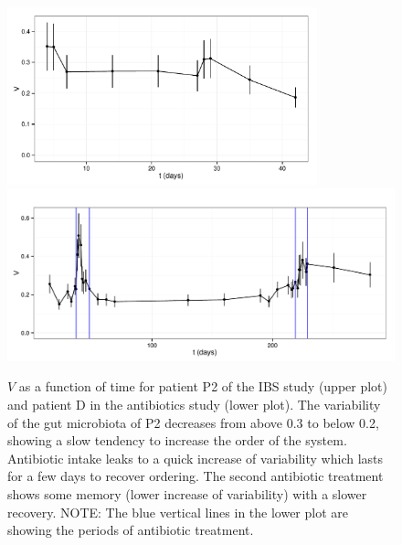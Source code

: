 \begin{figure}
	\centering 
 	\includegraphics[width=0.8\textwidth]{results/sliwin/patP2_IBS.pdf}
  	\includegraphics[width=1.0\textwidth]{results/sliwin/patD_antibio.pdf} 
\caption{$V$ as a function of time for patient P2 of the IBS study\cite{IBS} (upper plot) and patient D in the antibiotics study\cite{antibiotic} (lower plot). The variability 
of the gut microbiota of P2 decreases from above 0.3 to below 0.2, showing a slow tendency to increase the order of the system.  Antibiotic intake leaks to a quick increase of variability which lasts for a few days to recover ordering. The second antibiotic treatment shows some memory (lower increase of variability) with a slower recovery. NOTE: The blue vertical lines in the lower plot are showing the periods of antibiotic treatment.}
\label{fig:tempevo2}
\end{figure}